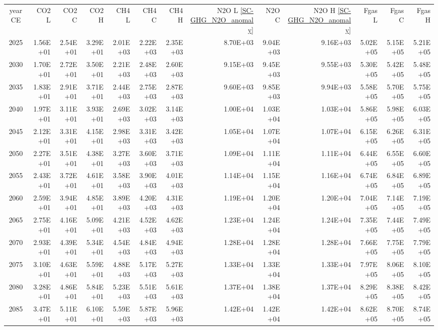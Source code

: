 \documentclass{article}
\begin{document}
\begin{table}
\begin{tabular}{crrr|rrr|rrr|rrr}
year CE  & CO2 L    & CO2 C    & CO2 H    & CH4 L    & CH4 C    & CH4 H    & N2O L \ref{SC-GHG_N2O_anomaly}     & N2O C      & N2O H \ref{SC-GHG_N2O_anomaly}    & Fgas L   & Fgas C   & Fgas H   \\
2025     & 1.56E+01 & 2.54E+01 & 3.29E+01 & 2.01E+03 & 2.22E+03 & 2.35E+03 & 8.70E+03 & 9.04E+03 & 9.16E+03 & 5.02E+05 & 5.15E+05 & 5.21E+05 \\
2030     & 1.70E+01 & 2.72E+01 & 3.50E+01 & 2.21E+03 & 2.48E+03 & 2.60E+03 & 9.15E+03 & 9.45E+03 & 9.55E+03 & 5.30E+05 & 5.42E+05 & 5.48E+05 \\
2035     & 1.83E+01 & 2.91E+01 & 3.71E+01 & 2.44E+03 & 2.75E+03 & 2.87E+03 & 9.60E+03 & 9.85E+03 & 9.94E+03 & 5.58E+05 & 5.70E+05 & 5.75E+05 \\
2040     & 1.97E+01 & 3.11E+01 & 3.93E+01 & 2.69E+03 & 3.02E+03 & 3.14E+03 & 1.00E+04 & 1.03E+04 & 1.03E+04 & 5.86E+05 & 5.98E+05 & 6.03E+05 \\
2045     & 2.12E+01 & 3.31E+01 & 4.15E+01 & 2.98E+03 & 3.31E+03 & 3.42E+03 & 1.05E+04 & 1.07E+04 & 1.07E+04 & 6.15E+05 & 6.26E+05 & 6.31E+05 \\
2050     & 2.27E+01 & 3.51E+01 & 4.38E+01 & 3.27E+03 & 3.60E+03 & 3.71E+03 & 1.09E+04 & 1.11E+04 & 1.11E+04 & 6.44E+05 & 6.55E+05 & 6.60E+05 \\
2055     & 2.43E+01 & 3.72E+01 & 4.61E+01 & 3.58E+03 & 3.90E+03 & 4.01E+03 & 1.14E+04 & 1.15E+04 & 1.16E+04 & 6.74E+05 & 6.84E+05 & 6.89E+05 \\
2060     & 2.59E+01 & 3.94E+01 & 4.85E+01 & 3.89E+03 & 4.20E+03 & 4.31E+03 & 1.19E+04 & 1.20E+04 & 1.20E+04 & 7.04E+05 & 7.14E+05 & 7.19E+05 \\
2065     & 2.75E+01 & 4.16E+01 & 5.09E+01 & 4.21E+03 & 4.52E+03 & 4.62E+03 & 1.23E+04 & 1.24E+04 & 1.24E+04 & 7.35E+05 & 7.44E+05 & 7.49E+05 \\
2070     & 2.93E+01 & 4.39E+01 & 5.34E+01 & 4.54E+03 & 4.84E+03 & 4.94E+03 & 1.28E+04 & 1.28E+04 & 1.28E+04 & 7.66E+05 & 7.75E+05 & 7.79E+05 \\
2075     & 3.10E+01 & 4.63E+01 & 5.59E+01 & 4.88E+03 & 5.17E+03 & 5.27E+03 & 1.33E+04 & 1.33E+04 & 1.33E+04 & 7.97E+05 & 8.06E+05 & 8.10E+05 \\
2080     & 3.28E+01 & 4.86E+01 & 5.84E+01 & 5.23E+03 & 5.51E+03 & 5.61E+03 & 1.37E+04 & 1.38E+04 & 1.37E+04 & 8.29E+05 & 8.38E+05 & 8.42E+05 \\
2085     & 3.47E+01 & 5.11E+01 & 6.10E+01 & 5.59E+03 & 5.87E+03 & 5.96E+03 & 1.42E+04 & 1.42E+04 & 1.42E+04 & 8.62E+05 & 8.70E+05 & 8.74E+05 \\

\end{tabular}
\end{table}
\end{document}
